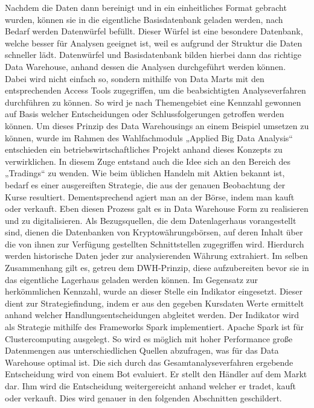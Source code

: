 Nachdem die Daten dann bereinigt und in ein einheitliches Format gebracht wurden, können sie in die eigentliche Basisdatenbank geladen werden, nach Bedarf werden  Datenwürfel befüllt. Dieser Würfel ist eine besondere Datenbank, welche besser für Analysen geeignet ist, weil es aufgrund der Struktur die Daten schneller lädt. Datenwürfel und Basisdatenbank bilden hierbei dann das richtige Data Warehouse, anhand dessen die Analysen durchgeführt werden können. Dabei wird nicht einfach so, sondern mithilfe von Data Marts mit den entsprechenden Access Tools zugegriffen, um die beabsichtigten Analyseverfahren durchführen zu können. So wird je nach Themengebiet eine Kennzahl gewonnen auf Basis welcher Entscheidungen oder Schlussfolgerungen getroffen werden können.
Um dieses Prinzip des Data Warehousings an einem Beispiel umsetzen zu können, wurde im Rahmen des Wahlfachmoduls „Applied Big Data Analysis“ entschieden ein betriebswirtschaftliches Projekt anhand dieses Konzepts zu verwirklichen. In diesem Zuge entstand auch die Idee sich an den Bereich des „Tradings“ zu wenden. Wie beim üblichen Handeln mit Aktien bekannt ist, bedarf es einer ausgereiften Strategie, die aus der genauen Beobachtung der Kurse resultiert. Dementsprechend agiert man an der Börse, indem man kauft oder verkauft. Eben diesen Prozess galt es in Data Warehouse Form zu realisieren und zu digitalisieren. Als Bezugsquellen, die dem Datenlagerhaus vorangestellt sind, dienen die Datenbanken von Kryptowährungsbörsen, auf deren Inhalt über die von ihnen zur Verfügung gestellten Schnittstellen zugegriffen wird. Hierdurch werden historische Daten jeder zur analysierenden Währung extrahiert. Im selben Zusammenhang gilt es, getreu dem DWH-Prinzip, diese aufzubereiten bevor sie in das eigentliche Lagerhaus geladen werden können. Im Gegensatz zur herkömmlichen Kennzahl, wurde an dieser Stelle ein Indikator eingesetzt. Dieser dient zur Strategiefindung, indem er aus den gegeben Kursdaten Werte ermittelt anhand welcher Handlungsentscheidungen abgleitet werden. Der Indikator wird als Strategie mithilfe des Frameworks Spark implementiert. 
Apache Spark ist für Clustercomputing ausgelegt. So wird es möglich mit hoher Performance große Datenmengen aus unterschiedlichen Quellen abzufragen, was für das Data Warehouse optimal ist. Die sich durch das Gesamtanalyseverfahren ergebende Entscheidung wird von einem Bot evaluiert. Er stellt den Händler auf dem Markt dar. Ihm wird die Entscheidung weitergereicht anhand welcher er tradet, kauft oder verkauft. Dies wird genauer in den folgenden Abschnitten geschildert.
